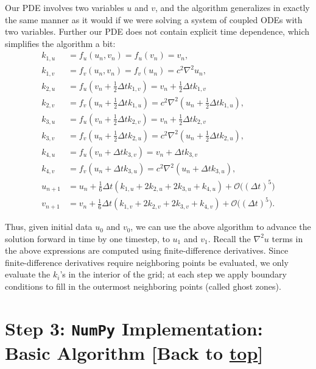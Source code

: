 \documentclass[landscape,letterpaper,10pt,english]{article}
\begin{document}
Our PDE involves two variables \(u\) and \(v\), and the algorithm
generalizes in exactly the same manner as it would if we were solving a
system of coupled ODEs with two variables. Further our PDE does not
contain explicit time dependence, which simplifies the algorithm a bit:
\begin{align}
k_{1,u} &= f_u(u_n,v_n) = f_u(v_n) = v_n, \\
k_{1,v} &= f_v(u_n,v_n) = f_v(u_n) = c^2\nabla^2 u_n, \\
k_{2,u} &= f_u\left(v_n + \frac{1}{2}\Delta tk_{1,v}\right) = v_n + \frac{1}{2}\Delta tk_{1,v}\\
k_{2,v} &= f_v\left(u_n + \frac{1}{2}\Delta tk_{1,u}\right) = c^2\nabla^2 \left(u_n + \frac{1}{2}\Delta tk_{1,u}\right), \\
k_{3,u} &= f_u\left(v_n + \frac{1}{2}\Delta tk_{2,v}\right) = v_n + \frac{1}{2}\Delta tk_{2,v}\\
k_{3,v} &= f_v\left(u_n + \frac{1}{2}\Delta tk_{2,u}\right) = c^2\nabla^2 \left(u_n + \frac{1}{2}\Delta tk_{2,u}\right), \\
k_{4,u} &= f_u(v_n + \Delta tk_{3,v}) = v_n + \Delta tk_{3,v}\\
k_{4,v} &= f_v(u_n + \Delta tk_{3,u}) = c^2\nabla^2 \left(u_n + \Delta tk_{3,u}\right), \\
u_{n+1} &= u_n + \frac{1}{6}\Delta t(k_{1,u} + 2k_{2,u} + 2k_{3,u} + k_{4,u}) + \mathcal{O}\big((\Delta t)^5\big)\\
v_{n+1} &= v_n + \frac{1}{6}\Delta t(k_{1,v} + 2k_{2,v} + 2k_{3,v} + k_{4,v}) + \mathcal{O}\big((\Delta t)^5\big).
\end{align}

Thus, given initial data \(u_0\) and \(v_0\), we can use the above
algorithm to advance the solution forward in time by one timestep, to
\(u_1\) and \(v_1\). Recall the \(\nabla^2 u\) terms in the above
expressions are computed using finite-difference derivatives. Since
finite-difference derivatives require neighboring points be evaluated,
we only evaluate the \(k_i\)'s in the interior of the grid; at each step
we apply boundary conditions to fill in the outermost neighboring points
(called ghost zones).

    \hypertarget{step-3-numpy-implementation-basic-algorithm-back-to-top}{%
\section{\texorpdfstring{Step 3: \texttt{NumPy} Implementation: Basic
Algorithm {[}Back to
\hyperref[toc]{top}{]}}{Step 3: NumPy Implementation: Basic Algorithm {[}Back to {]}}}\label{step-3-numpy-implementation-basic-algorithm-back-to-top}}
\end{document}
